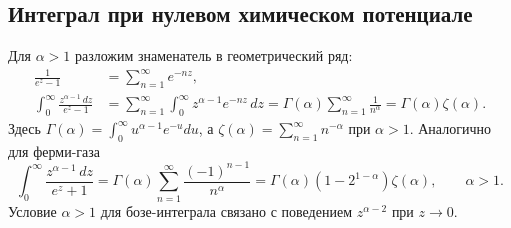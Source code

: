 \documentclass[../final.tex]{subfiles}
\begin{document}
\subsection{Интеграл при нулевом химическом потенциале}
Для $\alpha>1$ разложим знаменатель в геометрический ряд:
\begin{align*}
 \frac1{e^z-1}&=\sum_{n=1}^{\infty}e^{-nz},\\
 \int_0^\infty\frac{z^{\alpha-1}\,dz}{e^z-1}
 &=\sum_{n=1}^{\infty}\int_0^\infty z^{\alpha-1}e^{-nz}\,dz
 =\Gamma(\alpha)\sum_{n=1}^{\infty}\frac1{n^\alpha}
 =\Gamma(\alpha)\zeta(\alpha).
\end{align*}
Здесь $\Gamma(\alpha)=\int_0^\infty u^{\alpha-1}e^{-u}du$,
а $\zeta(\alpha)=\sum_{n=1}^\infty n^{-\alpha}$ при $\alpha>1$.
Аналогично для ферми-газа
\begin{equation*}
 \int_0^\infty\frac{z^{\alpha-1}\,dz}{e^z+1}
 =\Gamma(\alpha)\sum_{n=1}^{\infty}\frac{(-1)^{n-1}}{n^\alpha}
 =\Gamma(\alpha)(1-2^{1-\alpha})\zeta(\alpha),\qquad \alpha>1.
\end{equation*}
Условие $\alpha>1$ для бозе-интеграла связано с поведением
$z^{\alpha-2}$ при $z\to0$.
\end{document}
